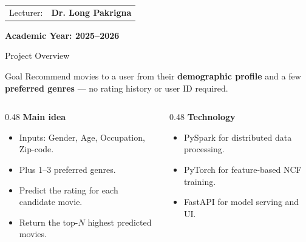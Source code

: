 \documentclass[aspectratio=169]{beamer}
\begin{document}
\begin{frame}[plain]
\begin{center}
  \vspace{0.3cm}

  \begin{tabular}{rl}
    Lecturer: & \bfseries Dr. Long Pakrigna \\
  \end{tabular}

  \vspace{0.3cm}

  {\bfseries Academic Year: 2025--2026}
\end{center}
\end{frame}

\begin{frame}{Project Overview}
\begin{block}{Goal}
Recommend movies to a user from their \textbf{demographic profile} and a few
\textbf{preferred genres} --- no rating history or user ID required.
\end{block}

\vspace{0.2cm}

\begin{columns}
  \begin{column}{0.48\textwidth}
    \textbf{Main idea}
    \begin{itemize}
      \item Inputs: Gender, Age, Occupation, Zip-code.
      \item Plus 1--3 preferred genres.
      \item Predict the rating for each candidate movie.
      \item Return the top-$N$ highest predicted movies.
    \end{itemize}
  \end{column}
  \begin{column}{0.48\textwidth}
    \textbf{Technology}
    \begin{itemize}
      \item PySpark for distributed data processing.
      \item PyTorch for feature-based NCF training.
      \item FastAPI for model serving and UI.
    \end{itemize}
  \end{column}
\end{columns}
\end{frame}
\end{document}

